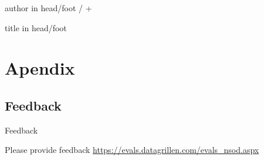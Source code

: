 \documentclass[english,aspectratio=169]{beamer}
\begin{document}
\appendix
{%
\begin{beamercolorbox}[wd=0.5\textwidth,ht=3ex,dp=1.5ex,leftskip=.5em,rightskip=.5em]{author in head/foot}%
%
\insertframenumber{} / \insertmainframenumber{} + \insertappendixframenumber{}\hfill\insertshortauthor%
\end{beamercolorbox}%
\vspace*{-4.5ex}\hspace*{0.5\textwidth}%
\begin{beamercolorbox}[wd=0.5\textwidth,ht=3ex,dp=1.5ex,left,leftskip=.5em]{title in head/foot}%
%
\insertshorttitle%
\end{beamercolorbox}%
}
\beamerdefaultoverlayspecification{}

\section*{Apendix}

\subsection*{Feedback}
\begin{frame}{Feedback}
\begin{center}
{  Please provide feedback}
\url{https://evals.datagrillen.com/evals_nsod.aspx}
\end{center}
\end{frame}
\end{document}
